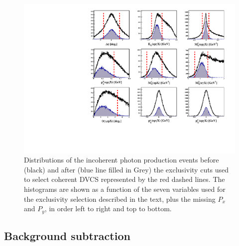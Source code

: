 \documentclass[aps,prc,preprint,superscriptaddress]{revtex4}
\begin{document}
\begin{figure}[tbp!]
\center
\includegraphics[trim=20 10 20 5,clip,width=15cm]{fig3/all_incoh_exc_cuts.pdf}
\caption{Distributions of the incoherent photon production events before 
	(black) and after (blue line filled
	in Grey) the exclusivity cuts used to select coherent DVCS represented by the 
	red dashed lines. The histograms are shown as a function of the 
	seven variables used for the exclusivity selection described in the text, 
	plus the missing $P_x$ and $P_y$, in order left to right and top to bottom.}
\label{fig:IncExcCuts}
\end{figure}

\subsection{Background subtraction}
\end{document}
